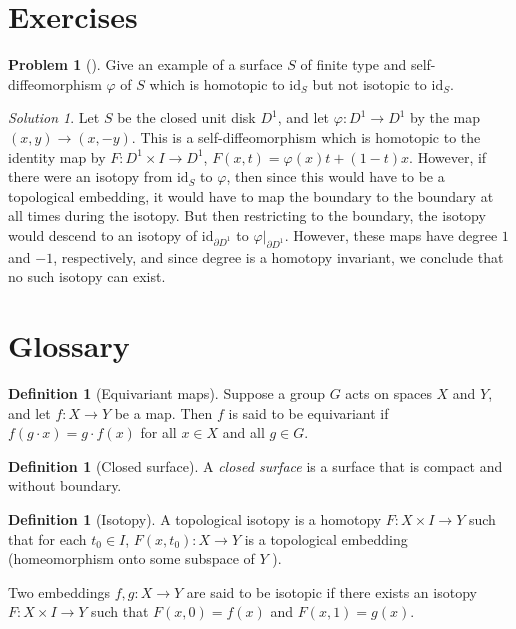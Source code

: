 \documentclass[reqno]{amsart}
\theoremstyle{definition}
\newtheorem{definition}[theorem]{Definition}
\newtheorem{problem}[theorem]{Problem}
\theoremstyle{remark}
\newtheorem*{solution}{Solution}
\newcommand{\id}{{\mathrm{id}}}
\begin{document}
\newpage

\section{Exercises}

\begin{problem}[]
    Give an example of a surface $S$ of finite type and
    self-diffeomorphism $\varphi $ of $S$ which is
    homotopic to $\id_S$ but not isotopic to $\id_S$.
\end{problem}

\begin{solution}
    Let $S$ be the closed
    unit disk $D^{1}$, and let $\varphi \colon D^{1} \to D^{1}$
    by the map $\left( x,y \right) \to (x,-y)$.
    This is a self-diffeomorphism which is homotopic to
    the identity map by
    $F \colon D^{1} \times I \to D^{1}$,
    $F(x,t) = \varphi(x) t + (1-t)x$. However,
    if there were an isotopy from $\id_S$ to 
    $\varphi$, then since this would have to be a topological embedding, it
    would have to map the boundary to the boundary at all
    times during the isotopy. But then restricting to the boundary,
    the isotopy would descend to an isotopy of
     $\id_{\partial D^{1}}$ to $\varphi|_{\partial D^{1}}$.
     However, these maps have degree $1$ and $-1$, respectively,
     and since degree is a homotopy invariant,
     we conclude that no such isotopy can exist.
\end{solution}




\newpage

\section{Glossary}

\begin{definition}[Equivariant maps]
    Suppose a group $G$ acts on spaces $X$ and $Y$, and let $f \colon X
    \to Y$ be a map. Then  $f$ is said to be equivariant if
    $f (g \cdot x) = g \cdot  f(x)$ for all $x \in X$ and all $g \in G$.
\end{definition}

\begin{definition}[Closed surface]
    A \textit{closed surface} is a surface that is compact
    and without boundary.
\end{definition}

\begin{definition}[Isotopy]
    A topological isotopy is a homotopy
    $F \colon X \times I \to Y$ such that for each $t_0 \in I$,
    $F(x,t_0) \colon X \to Y$ is a topological embedding (homeomorphism onto
    some subspace of $Y$ ).

    Two embeddings $f,g \colon X \to Y$ are said to be
    isotopic if there exists an isotopy $F \colon X \times I
    \to Y$ such that $F(x,0) = f(x)$ and $F(x,1) = g(x)$.
\end{definition}
\end{document}
